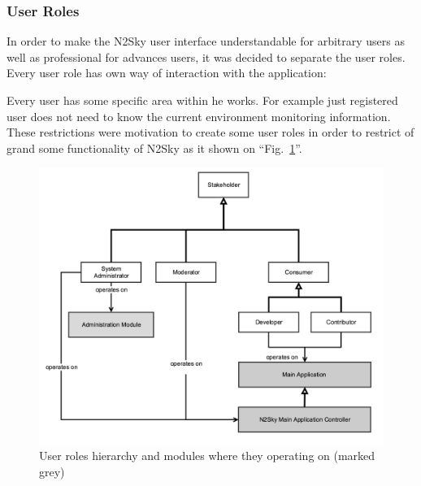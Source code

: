 \subsubsection{User Roles}\label{User Roles}

In order to make the N2Sky user interface understandable for arbitrary users as well as professional for advances users, it was decided to separate the user roles. Every user role has own way of interaction with the application:

Every user has some specific area within he works. For example just registered user does not need to know the current environment monitoring information. These restrictions were motivation to create some user roles in order to restrict of grand some functionality of N2Sky as it shown on ``Fig.~\ref{fig:userroles}''.

\begin{figure}[htbp]
\begin{center}
  \includegraphics[width=\linewidth]{components/4/users.png}
  \caption{User roles hierarchy and modules where they operating on (marked grey)}
  \label{fig:userroles}
\end{center}
\end{figure}

